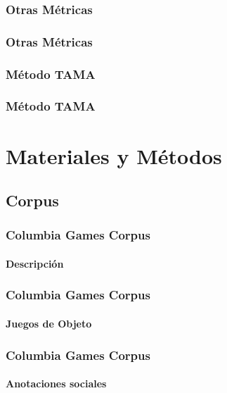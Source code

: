 \documentclass{beamer}
\begin{document}
\begin{frame}
  \frametitle{Otras Métricas}
\end{frame}

\begin{frame}
  \frametitle{Otras Métricas}
  \subtitle{Problemas}
\end{frame}



\begin{frame}
  \frametitle{Método TAMA}
\end{frame}


\begin{frame}
  \frametitle{Método TAMA}
  \subtitle{Ventajas}
\end{frame}


\section{Materiales y Métodos}

\subsection{Corpus}
\begin{frame}
  \frametitle{Columbia Games Corpus}
  \framesubtitle{Descripción}

\end{frame}


\begin{frame}
  \frametitle{Columbia Games Corpus}
  \framesubtitle{Juegos de Objeto}

\end{frame}


\begin{frame}
  \frametitle{Columbia Games Corpus}
  \framesubtitle{Anotaciones sociales}

\end{frame}
\end{document}
